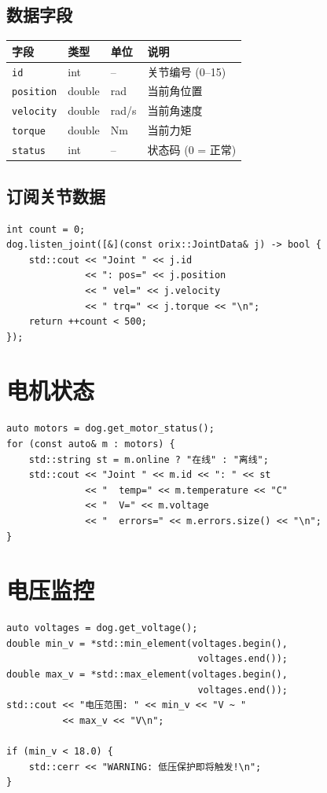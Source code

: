 \documentclass[a4paper,11pt,openany]{book}
\begin{document}
\subsection{数据字段}

\begin{longtable}{llll}
\toprule
字段 & 类型 & 单位 & 说明 \\
\midrule
\endhead
\texttt{id} & int & -- & 关节编号 (0--15) \\
\texttt{position} & double & rad & 当前角位置 \\
\texttt{velocity} & double & rad/s & 当前角速度 \\
\texttt{torque} & double & Nm & 当前力矩 \\
\texttt{status} & int & -- & 状态码 (0 = 正常) \\
\bottomrule
\end{longtable}

\subsection{订阅关节数据}

\begin{lstlisting}[style=cpp]
int count = 0;
dog.listen_joint([&](const orix::JointData& j) -> bool {
    std::cout << "Joint " << j.id
              << ": pos=" << j.position
              << " vel=" << j.velocity
              << " trq=" << j.torque << "\n";
    return ++count < 500;
});
\end{lstlisting}

\section{电机状态}

\begin{lstlisting}[style=cpp]
auto motors = dog.get_motor_status();
for (const auto& m : motors) {
    std::string st = m.online ? "在线" : "离线";
    std::cout << "Joint " << m.id << ": " << st
              << "  temp=" << m.temperature << "C"
              << "  V=" << m.voltage
              << "  errors=" << m.errors.size() << "\n";
}
\end{lstlisting}

\section{电压监控}

\begin{lstlisting}[style=cpp]
auto voltages = dog.get_voltage();
double min_v = *std::min_element(voltages.begin(),
                                  voltages.end());
double max_v = *std::max_element(voltages.begin(),
                                  voltages.end());
std::cout << "电压范围: " << min_v << "V ~ "
          << max_v << "V\n";

if (min_v < 18.0) {
    std::cerr << "WARNING: 低压保护即将触发!\n";
}
\end{lstlisting}
\end{document}
